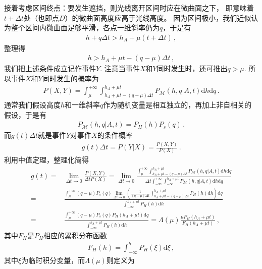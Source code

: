 接着考虑区间终点：要发生遮挡，则光线离开区间时应在微曲面之下，
即意味着$t+\Delta t$处（也即点$D$）的微曲面高度应高于光线高度。
因为区间极小，我们近似认为整个区间内微曲面足够平滑，各点一维斜率仍为$q$，于是有
\begin{align}
    h+q\Delta t>h_A+\mu(t+\Delta t)\, ,
\end{align}
整理得
\begin{align}
    h>h_A+\mu t-(q-\mu)\Delta t\, ,
\end{align}
我们把上述条件成立记作事件$Y$.
注意当事件$X$和$Y$同时发生时，还可推出$q>\mu$.
所以事件$X$和$Y$同时发生的概率为
\begin{align}
    P(X,Y)=\int_{\mu}^{+\infty}\int_{h_A+\mu t-(q-\mu)\Delta t}^{h_A+\mu t}
    P_{\mathcal{M}}(h,q|A,t)\mathrm{d}h\mathrm{d}q\, .
\end{align}
通常我们假设高度$h$和一维斜率$q$作为随机变量是相互独立的，再加上非自相关的假设，于是有
\begin{align}
    P_{\mathcal{M}}(h,q|A,t)=P_H(h)P_s(q)\, .
\end{align}
而$g(t)\Delta t$就是事件$Y$对事件$X$的条件概率
\begin{align}
    g(t)\Delta t=P(Y|X)=\frac{P(X,Y)}{P(X)}\, .
\end{align}
利用中值定理，整理化简得
\begin{align}\label{eq:08ex01-gt-expression}
    g(t)=&\lim\limits_{\Delta t\to 0}\frac{P(X,Y)}{\Delta tP(X)}
    =\lim\limits_{\Delta t\to 0}\frac{\displaystyle\int_{\mu}^{+\infty}\int_{h_A+\mu t-(q-\mu)\Delta t}^{h_A+\mu t}
    P_{\mathcal{M}}(h,q|A,t)\mathrm{d}h\mathrm{d}q}{\Delta t\displaystyle\int_{-\infty}^{+\infty}
    \int_{-\infty}^{h_A+\mu t}P_{\mathcal{M}}(h,q|A,t)\mathrm{d}h\mathrm{d}q}\nonumber\\
    =&\frac{\displaystyle\int_{\mu}^{+\infty}(q-\mu)P_s(q)\lim\limits_{\Delta t\to 0}
    \left(\frac{1}{(q-\mu)\Delta t}\int_{h_A+\mu t-(q-\mu)\Delta t}^{h_A+\mu t}P_H(h)\mathrm{d}h\right)\mathrm{d}q}
    {\displaystyle\int_{-\infty}^{h_A+\mu t}P_H(h)\mathrm{d}h}\nonumber\\
    =&\frac{\displaystyle\int_{\mu}^{+\infty}(q-\mu)P_s(q)P_H(h_A+\mu t)\mathrm{d}q}
    {\displaystyle\int_{-\infty}^{h_A+\mu t}P_H(h)\mathrm{d}h}
    =\Lambda(\mu)\frac{\mu P_H(h_A+\mu t)}{F_H(h_A+\mu t)}\, ,
\end{align}
其中$F_H$是$P_H$相应的累积分布函数
\begin{align}
    F_H(h)=\int_{-\infty}^{h}P_H(\xi)\mathrm{d}\xi\, ,
\end{align}
其中$\xi$为临时积分变量，而$\Lambda(\mu)$则定义为
